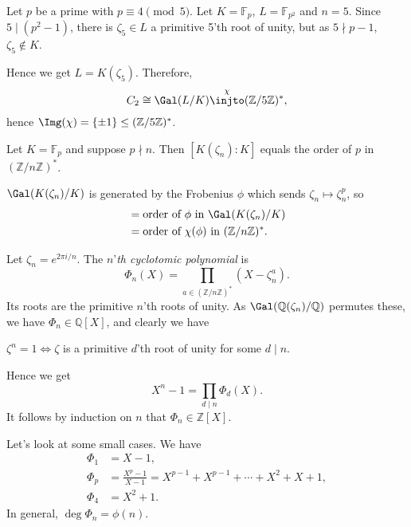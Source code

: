 \documentclass[12pt]{article}
\begin{document}
\begin{exbox}
	Let $p$ be a prime with $p \equiv 4 \pmod 5$. Let $K = \mathbb{F}_p$, $L = \mathbb{F}_{p^2}$ and $n = 5$. Since $5 \mid (p^2 - 1)$, there is $\zeta_5 \in L$ a primitive 5'th root of unity, but as $5 \nmid p-1$, $\zeta_5 \not \in K$.

	Hence we get $L = K(\zeta_5)$. Therefore,
	\[
		C_2 \cong \Gal(L/K) \overset{\chi}{\injto} (\mathbb{Z} / 5 \mathbb{Z})^{\ast},
	\]
	hence $\Img(\chi) = \{\pm 1\} \leq (\mathbb{Z} / 5 \mathbb{Z})^{\ast}$.
\end{exbox}

\begin{corollary}
	Let $K = \mathbb{F}_p$ and suppose $p \nmid n$. Then $[K(\zeta_n) : K]$ equals the order of $p$ in $(\mathbb{Z}/n \mathbb{Z})^{\ast}$.
\end{corollary}

\begin{proofbox}
	$\Gal(K(\zeta_n)/K)$ is generated by the Frobenius $\phi$ which sends $\zeta_n \mapsto \zeta_n^p$, so
	\begin{align*}
		[K(\zeta_n):K] &= \text{order of } \phi \text{ in } \Gal(K(\zeta_n)/K) \\
			       &= \text{order of } \chi(\phi) \text{ in } (\mathbb{Z}/n \mathbb{Z})^{\ast}.
	\end{align*}
\end{proofbox}

\begin{definition}
	Let $\zeta_n = e^{2\pi i/n}$. The $n$'\emph{th cyclotomic polynomial} is
	\[
	\Phi_n(X) = \prod_{a \in (\mathbb{Z} / n \mathbb{Z})^{\ast}}(X - \zeta_n^a).
	\]
	Its roots are the primitive $n$'th roots of unity. As $\Gal(\mathbb{Q}(\zeta_n) / \mathbb{Q})$ permutes these, we have $\Phi_n \in \mathbb{Q}[X]$, and clearly we have
	\begin{center}
		$\zeta^n = 1 \iff \zeta$ is a primitive $d$'th root of  unity for some $d \mid n$.
	\end{center}
	Hence we get
	\[
	X^n - 1 = \prod_{d \mid n} \Phi_d(X).
	\]
	It follows by induction on $n$ that $\Phi_n \in \mathbb{Z}[X]$.
\end{definition}

Let's look at some small cases. We have
\begin{align*}
	\Phi_1 &= X-1,\\
	\Phi_p &= \frac{X^p - 1}{X - 1} = X^{p-1} + X^{p-1} + \cdots + X^2 + X + 1,\\
	\Phi_4 &= X^2 + 1.
\end{align*}
In general, $\deg \Phi_n = \phi(n)$.
\end{document}
